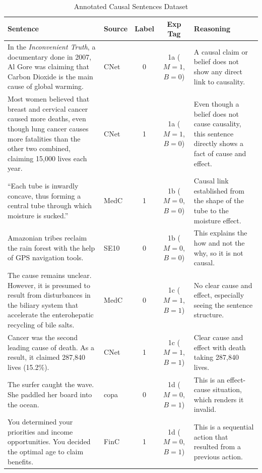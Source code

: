 \documentclass[conference]{IEEEtran}
\begin{document}
\begin{table}[ht]
  \centering
  \footnotesize
  \setlength{\tabcolsep}{6pt}
  \caption{Annotated Causal Sentences Dataset}
  \label{app:tab:example1}
  \begin{tabular}{
      >{\raggedright\arraybackslash}p{5cm}  %
      >{\raggedright\arraybackslash}p{2.5cm}  %
      c  %
      c  %
      >{\raggedright\arraybackslash}p{5cm}  %
    }
    \toprule
    \textbf{Sentence} & \textbf{Source} & \textbf{Label} & \textbf{Exp Tag} & \textbf{Reasoning} \\
    \midrule
    In the \textit{Inconvenient Truth}, a documentary done in 2007, Al Gore was claiming that Carbon Dioxide is the main cause of global warming.
      & CNet & 0 & 1a ($M=1$, $B=0$)
      & A causal claim or belief does not show any direct link to causality. \\
    \addlinespace
    Most women believed that breast and cervical cancer caused more deaths, even though lung cancer causes more fatalities than the other two combined, claiming 15,000 lives each year.
      & CNet & 1 & 1a ($M=1$, $B=0$)
      & Even though a belief does not cause causality, this sentence directly shows a fact of cause and effect. \\
    \addlinespace
    ``Each tube is inwardly concave, thus forming a central tube through which moisture is sucked.''
      & MedC & 1 & 1b ($M=0$, $B=0$)
      & Causal link established from the shape of the tube to the moisture effect. \\
    \addlinespace
    Amazonian tribes reclaim the rain forest with the help of GPS navigation tools.
      & SE10 & 0 & 1b ($M=0$, $B=0$)
      & This explains the how and not the why, so it is not causal. \\
    \addlinespace
    The cause remains unclear. However, it is presumed to result from disturbances in the biliary system that accelerate the enterohepatic recycling of bile salts.
      & MedC & 0 & 1c ($M=1$, $B=1$)
      & No clear cause and effect, especially seeing the sentence structure. \\
    \addlinespace
    Cancer was the second leading cause of death. As a result, it claimed 287,840 lives (15.2\%).
      & CNet & 1 & 1c ($M=1$, $B=1$)
      & Clear cause and effect with death taking 287,840 lives. \\
    \addlinespace
    The surfer caught the wave. She paddled her board into the ocean.
      & copa & 0 & 1d ($M=0$, $B=1$)
      & This is an effect-cause situation, which renders it invalid. \\
    \addlinespace
    You determined your priorities and income opportunities. You decided the optimal age to claim benefits.
      & FinC & 1 & 1d ($M=0$, $B=1$)
      & This is a sequential action that resulted from a previous action. \\
    \bottomrule
  \end{tabular}
\end{table}
\end{document}

